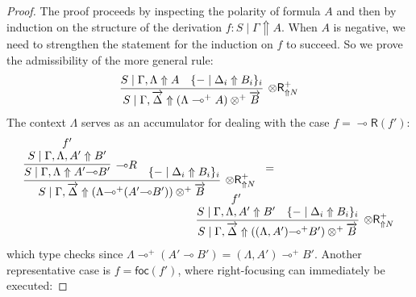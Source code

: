 \documentclass[runningheads]{llncs}
\renewcommand{\vec}{\overrightarrow}
\newcommand{\tr}{\otimes \mathsf{R}}
\newcommand{\lright}{{\multimap}\mathsf{R}}
\newcommand{\otR}{\tr}
\newcommand{\lolliR}{\lright}
\newcommand{\ot}{\otimes}
\newcommand{\lolli}{\multimap}
\newcommand{\proofbox}[1]{\begin{tabular}{l} #1 \end{tabular}}
\newcommand{\up}{\Uparrow}
\newcommand{\dn}{\Downarrow}
\newcommand{\foc}{\mathsf{foc}}
\newcommand{\focR}{\mathsf{foc_R}}
\newcommand{\blurR}{\mathsf{blur_R}}
\newcommand{\unfoc}{\mathsf{unfoc}}
\begin{document}
\begin{proof}
  The proof proceeds by inspecting the polarity of formula $A$ and then by induction on the structure of the derivation $f : S \mid \Gamma \up A$. When $A$ is negative, we need to strengthen the statement for the induction on $f$ to succeed. So we prove the admissibility of the more general rule:
  \begin{equation*}
    \label{eq:genotR}
    \begin{array}{c}
      \infer[\otR^+_{\up N}]{S \mid \Gamma , \vec{\Delta} \up (\Lambda \lolli^+ A) \ot^+ \vec{B}}{
      S \mid \Gamma,\Lambda \up A
      &
      \{ - \mid \Delta_i \up B_i \}_{i}
      }
    \end{array}
  \end{equation*}
  The context $\Lambda$ serves as an accumulator for dealing with the case $f = \lolliR(f')$:
  \begin{equation*}\label{eq:otRlolliR}
  \begin{array}{l}
    \proofbox{\infer[\otR^+_{\up N}]{S \mid \Gamma , \vec{\Delta} \up (\Lambda {\lolli}^+ (A' {\lolli} B')) \ot^+ \vec{B}}{
      \infer[{\lolli}R]{S \mid \Gamma,\Lambda\up A' {\lolli} B'}{
        \deduce{S \mid \Gamma,\Lambda,A'\up B'}{f'}
        }
      &
      \{ - \mid \Delta_i \up B_i \}_{i}
    }} =
    \\[-5pt]
       \hspace{5.4cm}
    \proofbox{
    \infer[\otR^+_{\up N}]{S \mid \Gamma , \vec{\Delta} \up ((\Lambda,A') {\lolli}^+ B') \ot^+ \vec{B}}{
      \deduce{S \mid \Gamma,\Lambda,A' \up B'}{f'}
      & 
      \{ - \mid \Delta_i \up B_i \}_{i}
    }
    }
  \end{array}
  \end{equation*}
  which type checks since $\Lambda {\lolli}^+ (A' {\lolli} B') = (\Lambda,A') {\lolli}^+ B'$.
  Another representative case is $f = \foc(f')$, where right-focusing can immediately be executed:

\end{proof}
\end{document}

